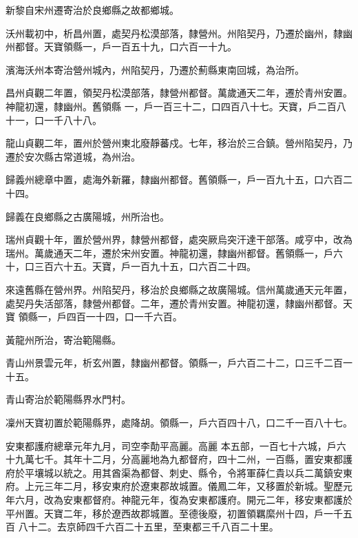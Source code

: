 \begin{pinyinscope}
 新黎自宋州遷寄治於良鄉縣之故都鄉城。



 沃州載初中，析昌州置，處契丹松漠部落，隸營州。州陷契丹，乃遷於幽州，隸幽州都督。天寶領縣一，戶一百五十九，口六百一十九。



 濱海沃州本寄治營州城內，州陷契丹，乃遷於薊縣東南回城，為治所。



 昌州貞觀二年置，領契丹松漠部落，隸營州都督。萬歲通天二年，遷於青州安置。神龍初還，隸幽州。舊領縣
 一，戶一百三十二，口四百八十七。天寶，戶二百八十一，口一千八十八。



 龍山貞觀二年，置州於營州東北廢靜蕃戍。七年，移治於三合鎮。營州陷契丹，乃遷於安次縣古常道城，為州治。



 歸義州總章中置，處海外新羅，隸幽州都督。舊領縣一，戶一百九十五，口六百二十四。



 歸義在良鄉縣之古廣陽城，州所治也。



 瑞州貞觀十年，置於營州界，隸營州都督，處突厥烏突汗達干部落。咸亨中，改為瑞州。萬歲通天二年，遷於宋州安置。神龍初還，隸幽州都督。舊領縣一，戶六十，口三百六十五。天寶，戶一百九十五，口六百二十四。



 來遠舊縣在營州界。州陷契丹，移治於良鄉縣之故廣陽城。信州萬歲通天元年置，處契丹失活部落，隸營州都督。二年，遷於青州安置。神龍初還，隸幽州都督。天寶
 領縣一，戶四百一十四，口一千六百。



 黃龍州所治，寄治範陽縣。



 青山州景雲元年，析玄州置，隸幽州都督。領縣一，戶六百二十二，口三千二百一十五。



 青山寄治於範陽縣界水門村。



 凜州天寶初置於範陽縣界，處降胡。領縣一，戶六百四十八，口二千一百八十七。



 安東都護府總章元年九月，司空李勣平高麗。高麗
 本五部，一百七十六城，戶六十九萬七千。其年十二月，分高麗地為九都督府，四十二州，一百縣，置安東都護府於平壤城以統之。用其酋渠為都督、刺史、縣令，令將軍薛仁貴以兵二萬鎮安東府。上元三年二月，移安東府於遼東郡故城置。儀鳳二年，又移置於新城。聖歷元年六月，改為安東都督府。神龍元年，復為安東都護府。開元二年，移安東都護於平州置。天寶二年，移於遼西故郡城置。至德後廢，初置領羈縻州十四，戶一千五百
 八十二。去京師四千六百二十五里，至東都三千八百二十里。




\end{pinyinscope}
